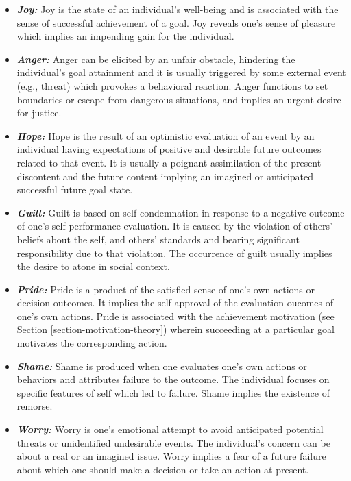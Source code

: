 \documentclass[12pt]{report}
\begin{document}
\begin{itemize}
  \item \textbf{\textit{Joy:}} Joy is the state of an individual's well-being
  and is associated with the sense of successful achievement of a goal. Joy
  reveals one's sense of pleasure which implies an impending gain for the
  individual.
  
  \item \textbf{\textit{Anger:}} Anger can be elicited by an unfair obstacle,
  hindering the individual's goal attainment and it is usually triggered by some
  external event (e.g., threat) which provokes a behavioral reaction. Anger
  functions to set boundaries or escape from dangerous situations, and implies
  an urgent desire for justice.
  
  \item \textbf{\textit{Hope:}} Hope is the result of an optimistic evaluation
  of an event by an individual having expectations of positive and desirable
  future outcomes related to that event. It is usually a poignant assimilation
  of the present discontent and the future content implying an imagined or
  anticipated successful future goal state.
  
  \item \textbf{\textit{Guilt:}} Guilt is based on self-condemnation in response
  to a negative outcome of one's self performance evaluation. It is caused by
  the violation of others' beliefs about the self, and others' standards and
  bearing significant responsibility due to that violation. The occurrence of
  guilt usually implies the desire to atone in social context.
  
  \item \textbf{\textit{Pride:}} Pride is a product of the satisfied sense of
  one's own actions or decision outcomes. It implies the self-approval of the
  evaluation oucomes of one's own actions. Pride is associated with the
  achievement motivation (see Section \ref{section-motivation-theory}) wherein
  succeeding at a particular goal motivates the corresponding action.
  
  \item \textbf{\textit{Shame:}} Shame is produced when one evaluates one's own
  actions or behaviors and attributes failure to the outcome. The individual
  focuses on specific features of self which led to failure. Shame implies the
  existence of remorse.
  
  \item \textbf{\textit{Worry:}} Worry is one's emotional attempt to avoid
  anticipated potential threats or unidentified undesirable events. The
  individual's concern can be about a real or an imagined issue. Worry implies a
  fear of a future failure about which one should make a decision or take an
  action at present.
  
\end{itemize}
\end{document}
